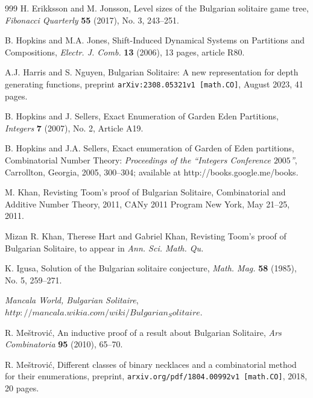 \documentclass[oneside,12pt]{amsart}
\theoremstyle{definition}
\numberwithin{equation}{section}
\begin{document}
\begin{thebibliography}{999}
 H. Erikksson and M. Jonsson, Level sizes of the 
Bulgarian solitaire game tree, {\it Fibonacci Quarterly} {\bf 55}
(2017), No. 3,  243--251. 


 B. Hopkins and M.A. Jones, Shift-Induced Dynamical
Systems on Partitions and Compositions, {\it Electr. J. 
 Comb.} {\bf 13} (2006), 13 pages, 
article R80.
 
A.J. Harris and S. Nguyen, Bulgarian Solitaire: A new representation for depth 
generating functions, preprint {\tt arXiv:2308.05321v1 [math.CO]},
August 2023, 41 pages.

 
  B. Hopkins and J. Sellers, Exact Enumeration
of Garden Eden Partitions, {\it Integers} {\bf 7} (2007), No. 2, Article 
A19.


 B. Hopkins and J.A. Sellers, Exact enumeration of Garden 
of Eden partitions, Combinatorial Number Theory: {\it Proceedings of the
``Integers Conference $2005$''}, Carrollton, Georgia, 2005, 300--304;
 available at http://books.google.me/books.


 M. Khan, Revisting Toom's proof of Bulgarian Solitaire,
Combinatorial and Additive Number Theory, 2011, 
 CANy 2011 Program
New York, May 21--25, 2011.

 Mizan R. Khan, Therese Hart and Gabriel Khan, 
Revisting Toom's proof of Bulgarian Solitaire, to appear in {\it Ann. Sci. 
Math. Qu.} 

 K. Igusa, Solution of the Bulgarian solitaire conjecture, 
{\it Math. Mag.}  {\bf 58} (1985), No. 5, 259--271.

 {\it Mancala World, Bulgarian Solitaire}, 
 $http://mancala.wikia.com/wiki/Bulgarian_Solitaire$.

 R. Me\v{s}trovi\'{c}, An inductive proof of 
a result about Bulgarian Solitaire, {\it Ars Combinatoria} {\bf 95}
(2010), 65--70. 

 R. Me\v{s}trovi\'{c}, Different classes  of binary necklaces 
and a combinatorial method for their enumerations, 
preprint, {\tt arxiv.org/pdf/1804.00992v1 [math.CO]}, 2018,  20 pages.
                                                                                                                                                                                                                                                                        


\end{thebibliography}
\end{document}
